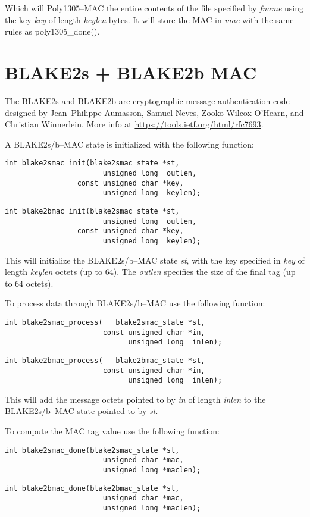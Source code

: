 \documentclass[synpaper]{book}
\newcommand{\mysection}[1]    %
	{                   %
	\section{#1}
   \markboth{\textsf{www.libtom.net}}{\thesection ~ {#1}}
	}
\begin{document}
Which will Poly1305--MAC the entire contents of the file specified by \textit{fname} using the key \textit{key} of
length \textit{keylen} bytes. It will store the MAC in \textit{mac} with the same rules as poly1305\_done().

\mysection{BLAKE2s + BLAKE2b MAC}

The BLAKE2s and BLAKE2b are cryptographic message authentication code designed by Jean--Philippe Aumasson,
Samuel Neves, Zooko Wilcox-O'Hearn, and Christian Winnerlein. More info at \url{https://tools.ietf.org/html/rfc7693}.

A BLAKE2s/b--MAC state is initialized with the following function:
\begin{verbatim}
int blake2smac_init(blake2smac_state *st,
                       unsigned long  outlen,
                 const unsigned char *key,
                       unsigned long  keylen);
\end{verbatim}
\begin{verbatim}
int blake2bmac_init(blake2smac_state *st,
                       unsigned long  outlen,
                 const unsigned char *key,
                       unsigned long  keylen);
\end{verbatim}
This will initialize the BLAKE2s/b--MAC state \textit{st}, with the key specified in \textit{key} of length \textit{keylen} octets (up to 64).
The \textit{outlen} specifies the size of the final tag (up to 64 octets).

To process data through BLAKE2s/b--MAC use the following function:
\begin{verbatim}
int blake2smac_process(   blake2smac_state *st,
                       const unsigned char *in,
                             unsigned long  inlen);
\end{verbatim}
\begin{verbatim}
int blake2bmac_process(   blake2bmac_state *st,
                       const unsigned char *in,
                             unsigned long  inlen);
\end{verbatim}

This will add the message octets pointed to by \textit{in} of length \textit{inlen} to the BLAKE2s/b--MAC state pointed to by \textit{st}.

To compute the MAC tag value use the following function:
\begin{verbatim}
int blake2smac_done(blake2smac_state *st,
                       unsigned char *mac,
                       unsigned long *maclen);
\end{verbatim}
\begin{verbatim}
int blake2bmac_done(blake2bmac_state *st,
                       unsigned char *mac,
                       unsigned long *maclen);
\end{verbatim}
\end{document}
